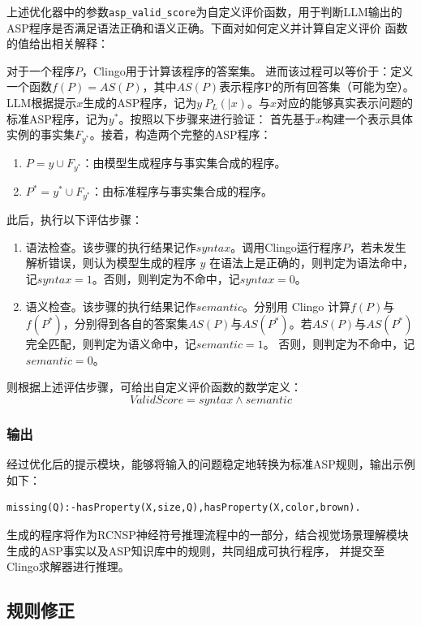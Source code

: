 上述优化器中的参数\texttt{asp\_valid\_score}为自定义评价函数，用于判断LLM输出的ASP程序是否满足语法正确和语义正确。下面对如何定义并计算自定义评价
函数的值给出相关解释：

对于一个程序$P$，Clingo用于计算该程序的答案集。
进而该过程可以等价于：定义一个函数$f(P) = AS(P)$，其中$AS(P)$表示程序P的所有回答集（可能为空）。
LLM根据提示$x$生成的ASP程序，记为$y ~ P_L(|x)$。与$x$对应的能够真实表示问题的标准ASP程序，记为$y^*$。按照以下步骤来进行验证：
首先基于$x$构建一个表示具体实例的事实集$F_{y^*}$。接着，构造两个完整的ASP程序：
\begin{enumerate}[nosep]
\item $P = y \cup F_{y^*}$：由模型生成程序与事实集合成的程序。
\item $P^* = y^* \cup F_{y^*}$：由标准程序与事实集合成的程序。
\end{enumerate}

此后，执行以下评估步骤：
\begin{enumerate}[nosep]
\item 语法检查。该步骤的执行结果记作$syntax$。调用Clingo运行程序$P$，若未发生解析错误，则认为模型生成的程序 $y$ 在语法上是正确的，则判定为语法命中，记$syntax = 1$。否则，则判定为不命中，记$syntax = 0$。
\item 语义检查。该步骤的执行结果记作$semantic$。分别用 Clingo 计算$f(P)$与$f(P^*)$，分别得到各自的答案集$AS(P)$与$AS(P^*)$。若$AS(P)$与$AS(P^*)$完全匹配，则判定为语义命中，记$semantic = 1$。
否则，则判定为不命中，记$semantic = 0$。
\end{enumerate}

则根据上述评估步骤，可给出自定义评价函数的数学定义：
$$ValidScore = syntax \land semantic $$
\subsubsection{输出}
经过优化后的提示模块，能够将输入的问题稳定地转换为标准ASP规则，输出示例如下：
\begin{lstlisting}
missing(Q):-hasProperty(X,size,Q),hasProperty(X,color,brown).
\end{lstlisting}

生成的程序将作为RCNSP神经符号推理流程中的一部分，结合视觉场景理解模块生成的ASP事实以及ASP知识库中的规则，共同组成可执行程序，
并提交至Clingo求解器进行推理。
\subsection{规则修正}
